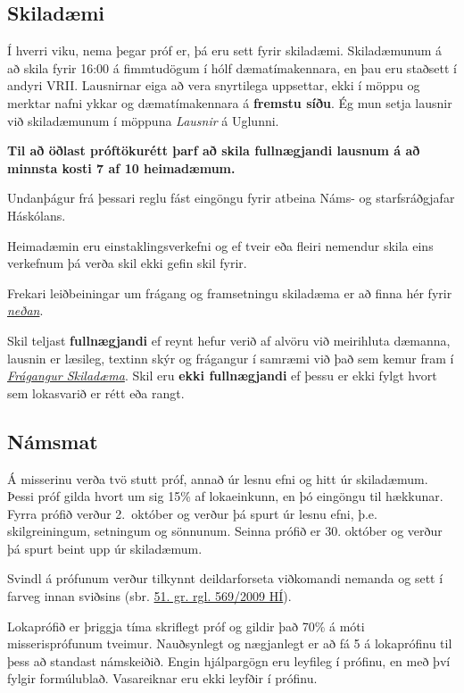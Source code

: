 \documentclass[b5paper,10pt,icelandic]{sphinxmanual}
\begin{document}
\subsection{Skiladæmi}
\label{vidauki:skiladaemi}
Í hverri viku, nema þegar próf er, þá eru sett fyrir
skiladæmi. Skiladæmunum á að skila fyrir 16:00 á fimmtudögum í hólf
dæmatímakennara, en þau eru staðsett í andyri VRII. Lausnirnar eiga að
vera snyrtilega uppsettar, ekki í möppu og merktar nafni ykkar og
dæmatímakennara á \textbf{fremstu síðu}. Ég mun setja lausnir við
skiladæmunum í möppuna \emph{Lausnir} á Uglunni.

\begin{center}\textbf{Til að öðlast próftökurétt þarf að skila fullnægjandi lausnum á
að minnsta kosti 7 af 10 heimadæmum.}
\end{center}
Undanþágur frá þessari reglu fást eingöngu fyrir atbeina Náms- og starfsráðgjafar Háskólans.

Heimadæmin eru einstaklingsverkefni og ef tveir eða fleiri nemendur skila
eins verkefnum þá verða skil ekki gefin skil fyrir.

Frekari leiðbeiningar um frágang og framsetningu skiladæma er að finna
hér fyrir {\hyperref[vidauki:fragangurskiladaema]{\emph{neðan}}}.

Skil teljast \textbf{fullnægjandi} ef reynt hefur verið af alvöru við meirihluta
dæmanna, lausnin er læsileg, textinn skýr og frágangur í samræmi við það sem
kemur fram í {\hyperref[vidauki:fragangurskiladaema]{\emph{Frágangur Skiladæma}}}.
Skil eru \textbf{ekki fullnægjandi} ef þessu er ekki fylgt hvort sem
lokasvarið er rétt eða rangt.


\subsection{Námsmat}
\label{vidauki:namsmat}
Á misserinu verða tvö stutt próf, annað úr lesnu efni og
hitt úr skiladæmum. Þessi próf gilda hvort um sig 15\% af lokaeinkunn, en
þó eingöngu til hækkunar. Fyrra prófið verður 2. október og verður þá
spurt úr lesnu efni, þ.e. skilgreiningum, setningum og sönnunum. Seinna
prófið er 30. október og verður þá spurt beint upp úr skiladæmum.

Svindl á prófunum verður
tilkynnt deildarforseta viðkomandi nemanda og sett í
farveg innan sviðsins (sbr.
\href{http://www.hi.is/adalvefur/reglur\_fyrir\_haskola\_islands\#51}{51. gr. rgl. 569/2009 HÍ}).

Lokaprófið er þriggja tíma skriflegt próf og gildir það 70\% á móti
misserisprófunum tveimur. Nauðsynlegt og nægjanlegt er að fá 5 á
lokaprófinu til þess að standast námskeiðið. Engin hjálpargögn eru
leyfileg í prófinu, en með því fylgir formúlublað.
Vasareiknar eru ekki leyfðir í prófinu.
\end{document}

